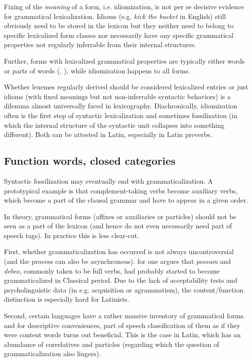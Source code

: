 \documentclass[a4paper, oneside, 12pt]{report}
\newcommand*{\citepage}[1]{p.~{#1}}
\newcommand{\form}[1]{\emph{#1}}
\begin{document}
Fixing of the \emph{meaning} of a form, i.e. idiomization, is not per se decisive evidence for grammatical lexicalization.
Idioms (e.g. \form{kick the bucket} in English) still obviously need to be stored in the lexicon but they neither need to belong to specific lexicalized form classes nor necessarily have any specific grammatical properties not regularly inferrable from their internal structures.

Further, forms with lexicalized grammatical properties are typically either words or parts of words (, ), while idiomization happens to all forms.

Whether lexemes regularly derived should be considered lexicalized entries or just idioms (with fixed meanings but not non-inferrable syntactic behaviors) is a dilemma almost universally faced in lexicography.
Diachronically, idiomization often is the first step of syntactic lexicalization and sometimes fossilization (in which the internal structure of the syntactic unit collapses into something different).
Both can be attested in Latin, especially in Latin preverbs.

\subsection{Function words, closed categories}\label{sec:grammatical.lexicon.function-word}

Syntactic fossilization may eventually end with grammaticalization.
A prototypical example is that 
complement-taking verbs become auxiliary verbs,
which become a part of the clausal grammar and have to appear in a given order.

In theory, grammatical forms (affixes or auxiliaries or particles) should not be seen as a part of the lexicon (and hence do not even necessarily need part of speech tags).
In practice this is less clear-cut.

First, whether grammaticalization has occurred is not always uncontroversial
(and the process can also be asynchronous).
\citet[\citepage{140}]{danckaert2017development} for one argues that \form{possum} and \form{debeo}, commonly taken to be full verbs, had probably started to become grammaticalized in Classical period.
Due to the lack of acceptability tests and psycholinguistic data (in e.g. acquisition or agrammatism), the content/function distinction is especially hard for Latinists.

Second, certain languages have a rather massive inventory of grammatical forms.
and for descriptive conveniences, part of speech classification of them as if they were content words turns out beneficial.
This is the case in Latin, which has an abundance of correlatives and particles 
(regarding which the question of grammaticalization also lingers).
\end{document}
